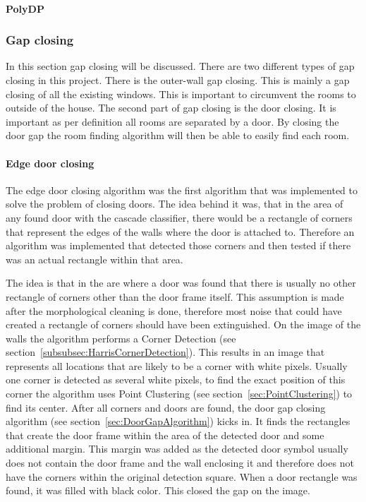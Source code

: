 \paragraph{PolyDP}
\label{sub:PolyDP}

\subsubsection{Gap closing}
In this section gap closing will be discussed. There are two different types of gap closing in this project. There is the outer-wall gap closing. This is mainly a gap closing of all the existing windows. This is important to circumvent the rooms to outside of the house. The second part of gap closing is the door closing. It is important as per definition all rooms are separated by a door. By closing the door gap the room finding algorithm will then be able to easily find each room.
\paragraph{Edge door closing}
The edge door closing algorithm was the first algorithm that was implemented to solve the problem of closing doors. The idea behind it was, that in the area of any found door with the cascade classifier, there would be a rectangle of corners that represent the edges of the walls where the door is attached to. Therefore an algorithm was implemented that detected those corners and then tested if there was an actual rectangle within that area.

The idea is that in the are where a door was found that there is usually no other rectangle of corners other than the door frame itself. This assumption is made after the morphological cleaning is done, therefore most noise that could have created a rectangle of corners should have been extinguished. On the image of the walls the algorithm performs a Corner Detection (see section~\ref{subsubsec:HarrisCornerDetection}). This results in an image that represents all locations that are likely to be a corner with white pixels. Usually one corner is detected as several white pixels, to find the exact position of this corner the algorithm uses Point Clustering (see section~\ref{sec:PointClustering}) to find its center. After all corners and doors are found, the door gap closing algorithm (see section~\ref{sec:DoorGapAlgorithm}) kicks in. It finds the rectangles that create the door frame within the area of the detected door and some additional margin. This margin was added as the detected door symbol usually does not contain the door frame and the wall enclosing it and therefore does not have the corners within the original detection square.
When a door rectangle was found, it was filled with black color. This closed the gap on the image.

